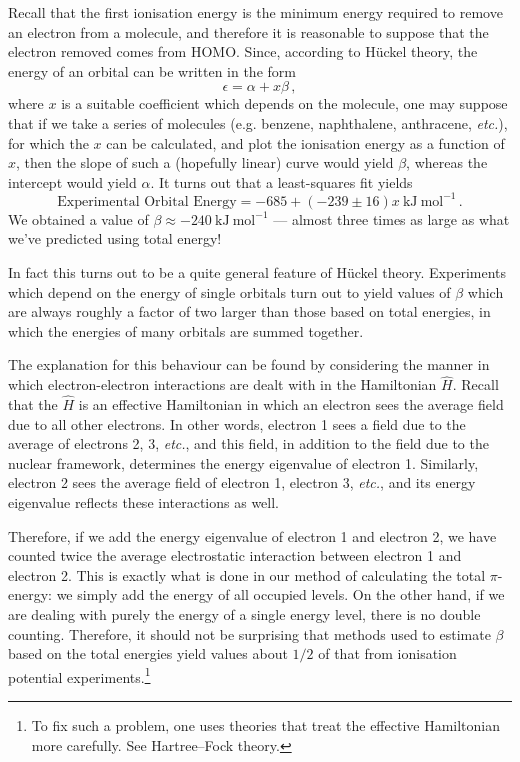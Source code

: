 \documentclass{article}
\theoremstyle{plain}\theoremheaderfont{\normalfont\itshape}\theorembodyfont{\rmfamily}\theoremseparator{.}\newtheorem*{rem}{Remark}\newtheorem*{ex}{Example}\newtheorem*{proof}{Proof}\newtheorem*{altp}{Alternative proof}
\theoremstyle{plain}\theoremheaderfont{\normalfont\bfseries}\theorembodyfont{\rmfamily}\theoremseparator{.}\newtheorem{thm}{Theorem}[section]\newtheorem{lem}[thm]{Lemma}\newtheorem{prop}[thm]{Proposition}\newtheorem*{cor}{Corollary}\newtheorem{defn}[thm]{Definition}\newtheorem{clm}[thm]{Claim}\newtheorem{clminproof}{Claim}\newtheorem{pos}{Postulate}[section]
\theoremstyle{break}\theoremheaderfont{\normalfont\itshape}\theorembodyfont{\rmfamily}\theoremseparator{.\medskip}\newtheorem*{proofskip}{Proof}\newtheorem*{exs}{Examples}\newtheorem*{rems}{Remarks}
\theoremstyle{break}\theoremheaderfont{\normalfont\bfseries}\theorembodyfont{\rmfamily}\theoremseparator{.\medskip}\newtheorem{lemskip}[thm]{Lemma}\newtheorem{defnskip}[thm]{Definition}\newtheorem{propskip}[thm]{Proposition}\newtheorem{thmskip}[thm]{Theorem}
\numberwithin{equation}{section}
\newcommand{\unit}[1]{\ \mathrm{#1}}
\begin{document}
    Recall that the first ionisation energy is the minimum energy required to remove an electron from a molecule, and therefore it is reasonable to suppose that the electron removed comes from HOMO. Since, according to H\"{u}ckel theory, the energy of an orbital can be written in the form
    \begin{equation}
        \epsilon=\alpha+x\beta\,,
    \end{equation}
    where \(x\) is a suitable coefficient which depends on the molecule, one may suppose that if we take a series of molecules (e.g. benzene, naphthalene, anthracene, \textit{etc.}), for which the \(x\) can be calculated, and plot the ionisation energy as a function of \(x\), then the slope of such a (hopefully linear) curve would yield \(\beta\), whereas the intercept would yield \(\alpha\). It turns out that a least-squares fit yields
    \begin{equation}
        \text{Experimental Orbital Energy}=-685+(-239\pm 16)x\unit{kJ}\unit{mol}^{-1}\,.
    \end{equation}
    We obtained a value of \(\beta\approx -240\unit{kJ}\unit{mol}^{-1}\) --- almost three times as large as what we've predicted using total energy!

    In fact this turns out to be a quite general feature of H\"{u}ckel theory. Experiments which depend on the energy of single orbitals turn out to yield values of \(\beta\) which are always roughly a factor of two larger than those based on total energies, in which the energies of many orbitals are summed together.

    The explanation for this behaviour can be found by considering the manner in which electron-electron interactions are dealt with in the Hamiltonian \(\hat{H}\). Recall that the \(\hat{H}\) is an effective Hamiltonian in which an electron sees the average field due to all other electrons. In other words, electron 1 sees a field due to the average of electrons 2, 3, \textit{etc.}, and this field, in addition to the field due to the nuclear framework, determines the energy eigenvalue of electron 1. Similarly, electron 2 sees the average field of electron 1, electron 3, \textit{etc.}, and its energy eigenvalue reflects these interactions as well.

    Therefore, if we add the energy eigenvalue of electron 1 and electron 2, we have counted twice the average electrostatic interaction between electron 1 and electron 2. This is exactly what is done in our method of calculating the total \(\pi\)-energy: we simply add the energy of all occupied levels. On the other hand, if we are dealing with purely the energy of a single energy level, there is no double counting. Therefore, it should not be surprising that methods used to estimate \(\beta\) based on the total energies yield values about \(1/2\) of that from ionisation potential experiments.\footnote{To fix such a problem, one uses theories that treat the effective Hamiltonian more carefully. See Hartree--Fock theory.}
    
\end{document}
